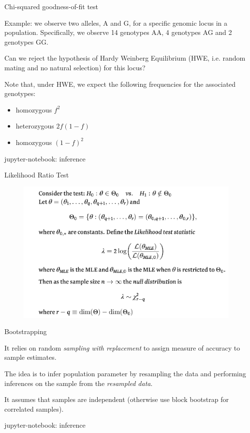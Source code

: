 \documentclass{beamer}
\begin{document}
\begin{frame}{Chi-squared goodness-of-fit test}

	Example: we observe two alleles, A and G, for a specific genomic locus in a population.
	Specifically, we observe 14 genotypes AA, 4 genotypes AG and 2 genotypes GG.

	\pause

	Can we reject the hypothesis of Hardy Weinberg Equilibrium (HWE, i.e. random mating and no natural selection) for this locus?

	\small
	Note that, under HWE, we expect the following frequencies for the associated genotypes:
	\begin{itemize}
		\item homozygous $f^2$
		\item heterozygous $2f(1-f)$
		\item homozygous $(1-f)^2$
	\end{itemize}

	\tiny jupyter-notebook: inference

\end{frame}

\begin{frame}{Likelihood Ratio Test}
	\begin{figure}
        	\includegraphics[width=0.85\linewidth]{lrt.png}
	\end{figure}
\end{frame}

\begin{frame}{Bootstrapping}

	It relies on random \textit{sampling with replacement} to assign measure
	of accuracy to sample estimates.

	\vskip 1cm

	The idea is to infer population parameter by resampling the data and performing
	inferences on the sample from the \textit{resampled data}.

	\vskip 1cm

	It assumes that samples are independent (otherwise use block bootstrap for correlated samples).

	\tiny jupyter-notebook: inference

\end{frame}
\end{document}
